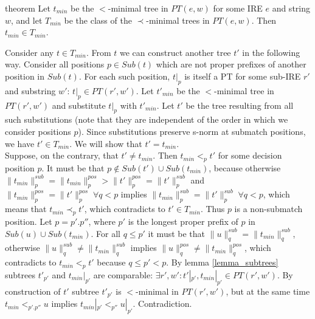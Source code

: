 \documentclass[AMA,STIX1COL]{WileyNJD-v2}
\newcommand{\PT}{PT}
\newcommand{\pnorm}[2]{\|{#1}\|^{pos}_{#2}}
\newcommand{\snorm}[2]{\|{#1}\|^{sub}_{#2}}
\begin{document}
\begin{theoremEnd}[restate, no link to proof, no link to theorem, category=theorem_order_compat]{theorem}
    \label{theorem_order_compat}
    Let $t_{min}$ be the $<$-minimal tree in $\PT(e,w)$ for some IRE $e$ and string $w$,
    and let $T_{min}$ be the class of the $\prec$-minimal trees in $\PT(e,w)$.
    Then $t_{min} \in T_{min}$.
\end{theoremEnd}
\begin{proofEnd}
    Consider any $t \in T_{min}$.
    From $t$ we can construct another tree $t'$ in the following way.
    Consider all positions $p \in Sub(t)$ which are not proper prefixes of another position in $Sub(t)$.
    For each such position, $t|_p$ is itself a PT for some sub-IRE $r'$ and substring $w'$: $t|_p \in \PT(r', w')$.
    Let $t'_{min}$ be the $<$-minimal tree in $\PT(r', w')$ and substitute $t|_p$ with $t'_{min}$.
    Let $t'$ be the tree resulting from all such substitutions
    (note that they are independent of the order in which we consider positions $p$).
    Since substitutions preserve s-norm at submatch positions, we have $t' \in T_{min}$.
    We will show that $t' = t_{min}$.
    \\[0.5em]
    Suppose, on the contrary, that $t' \neq t_{min}$.
    Then $t_{min} <_p t'$ for some decision position $p$.
    It must be that $p \not\in Sub(t') \cup Sub(t_{min})$, because
    otherwise $\snorm{t_{min}}{p} = \pnorm{t_{min}}{p} > \pnorm{t'}{p} = \snorm{t'}{p}$
    and $\pnorm{t_{min}}{p} = \pnorm{t'}{p} \; \forall q < p$ implies $\snorm{t_{min}}{p} = \snorm{t'}{p} \; \forall q < p$,
    which means that $t_{min} \prec_p t'$, which contradicts to $t' \in T_{min}$.
    Thus $p$ is a non-submatch position.
    Let $p = p'.p''$, where $p'$ is the longest proper prefix of $p$ in $Sub(u) \cup Sub(t_{min})$.
    For all $q \leq p'$ it must be that $\snorm{u}{q} = \snorm{t_{min}}{q}$,
    otherwise $\snorm{u}{q} \neq \snorm{t_{min}}{q}$ implies $\pnorm{u}{q} \neq \pnorm{t_{min}}{q}$,
    which contradicts to $t_{min} <_p t'$ because $q \leq p' < p$.
    By lemma \ref{lemma_subtrees} subtrees $t'_{p'}$ and $t_{min}|_{p'}$ are comparable:
    $\exists r', w' : t'|_{p'}, t_{min}|_{p'} \in \PT(r', w')$.
    By construction of $t'$ subtree $t'_{p'}$ is $<$-minimal in $\PT(r', w')$,
    but at the same time $t_{min} <_{p'.p''} u$ implies $t_{min}|_{p'} <_{p''} u|_{p'}$.
    Contradiction.
\end{proofEnd}
\end{document}
